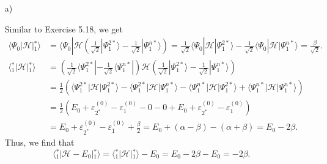 \documentclass[a4paper]{book}
\newcounter{solution}[chapter]
\begin{document}
	\begin{solution}
	
	\begin{itemize}
	
	\item[a)]
	
	Similar to Exercise 5.18, we get
	\begin{align*}
		\langle \Psi_0 | \mathscr{H} | {}^*_1 \rangle &= \langle \Psi_0 | \mathscr{H} \left( \frac{1}{ \sqrt{2} } | \Psi^{2*}_1 \rangle - \frac{1}{ \sqrt{2} } | \Psi^{n*}_1 \rangle \right) = \frac{1}{ \sqrt{2} } \langle \Psi_0 | \mathscr{H} | \Psi^{2*}_1 \rangle - \frac{1}{ \sqrt{2} } \langle \Psi_0 | \mathscr{H} | \Psi^{n*}_1 \rangle = \frac{ \beta }{ \sqrt{2} } . \\
		\langle {}^*_1 | \mathscr{H} | {}^*_1 \rangle &= \left( \frac{1}{ \sqrt{2} } \langle \Psi^{2*}_1 | - \frac{1}{ \sqrt{2} } \langle \Psi^{n*}_1 | \right) \mathscr{H} \left( \frac{1}{ \sqrt{2} } | \Psi^{2*}_1 \rangle - \frac{1}{ \sqrt{2} } | \Psi^{n*}_1 \rangle \right) \\
		&= \frac{1}{2} \left( \langle \Psi^{2*}_1 | \mathscr{H} | \Psi^{2*}_1 \rangle - \langle \Psi^{2*}_1 | \mathscr{H} | \Psi^{n*}_1 \rangle - \langle \Psi^{n*}_1 | \mathscr{H} | \Psi^{2*}_1 \rangle + \langle \Psi^{n*}_1 | \mathscr{H} | \Psi^{n*}_1 \rangle \right) \\
		&= \frac{1}{2} \left( E_0 + \varepsilon^{(0)}_{2^*} - \varepsilon^{(0)}_1 - 0 - 0 + E_0 + \varepsilon^{(0)}_{2^*} - \varepsilon^{(0)}_1 \right) \\
		&= E_0 + \varepsilon^{(0)}_{2^*} - \varepsilon^{(0)}_1 + \frac{ \beta }{2} = E_0 + \left( \alpha - \beta \right) - \left( \alpha + \beta \right) = E_0 - 2 \beta .
	\end{align*}
	Thus, we find that
	\[
		\langle {}^*_1 | \mathscr{H} - E_0 | {}^*_1 \rangle = \langle {}^*_1 | \mathscr{H} | {}^*_1 \rangle - E_0 = E_0 - 2 \beta - E_0 =  - 2 \beta .
	\]
	

\end{itemize}
\end{solution}
\end{document}
